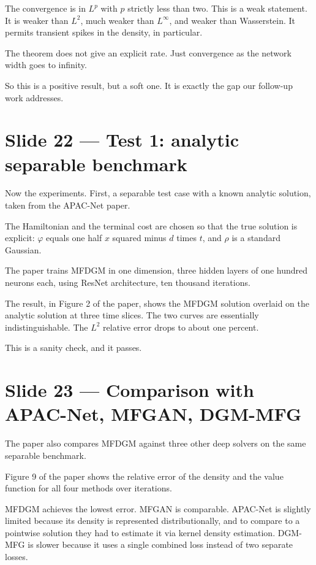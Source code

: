 \documentclass[11pt]{article}
\begin{document}
The convergence is in $L^p$ with $p$ strictly less than two.  This is a
weak statement.  It is weaker than $L^2$, much weaker than $L^\infty$,
and weaker than Wasserstein.  It permits transient spikes in the
density, in particular.

The theorem does not give an explicit rate.  Just convergence as the
network width goes to infinity.

So this is a positive result, but a soft one.  It is exactly the gap
our follow-up work addresses.

\section*{Slide 22 --- Test 1: analytic separable benchmark}

Now the experiments.  First, a separable test case with a known
analytic solution, taken from the APAC-Net paper.

The Hamiltonian and the terminal cost are chosen so that the true
solution is explicit: $\varphi$ equals one half $x$ squared minus
$d$ times $t$, and $\rho$ is a standard Gaussian.

The paper trains MFDGM in one dimension, three hidden layers of one
hundred neurons each, using ResNet architecture, ten thousand
iterations.

The result, in Figure 2 of the paper, shows the MFDGM solution overlaid
on the analytic solution at three time slices.  The two curves are
essentially indistinguishable.  The $L^2$ relative error drops to about
one percent.

This is a sanity check, and it passes.

\section*{Slide 23 --- Comparison with APAC-Net, MFGAN, DGM-MFG}

The paper also compares MFDGM against three other deep solvers on the
same separable benchmark.

Figure 9 of the paper shows the relative error of the density and the
value function for all four methods over iterations.

MFDGM achieves the lowest error.  MFGAN is comparable.  APAC-Net is
slightly limited because its density is represented distributionally,
and to compare to a pointwise solution they had to estimate it via
kernel density estimation.  DGM-MFG is slower because it uses a single
combined loss instead of two separate losses.
\end{document}
